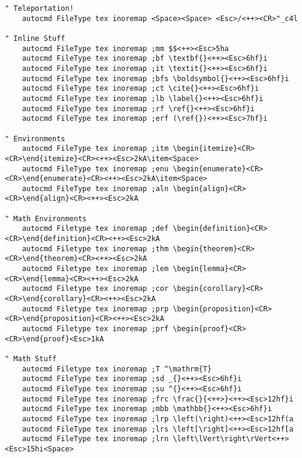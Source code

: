 \documentclass[10pt]{article}
\newtheorem{theorem}{Theorem}[section]
\newtheorem{lemma}[theorem]{Lemma}
\newtheorem{proposition}[theorem]{Proposition}
\newtheorem{corollary}[theorem]{Corollary}
\newtheorem{definition}[theorem]{Definition}
\begin{document}
\begin{lstlisting}
" Teleportation!
    autocmd FileType tex inoremap <Space><Space> <Esc>/<++><CR>"_c4l

" Inline Stuff
    autocmd FileType tex inoremap ;mm $$<++><Esc>5ha
    autocmd FileType tex inoremap ;bf \textbf{}<++><Esc>6hf}i
    autocmd FileType tex inoremap ;it \textit{}<++><Esc>6hf}i
    autocmd FileType tex inoremap ;bfs \boldsymbol{}<++><Esc>6hf}i
    autocmd FileType tex inoremap ;ct \cite{}<++><Esc>6hf}i
    autocmd FileType tex inoremap ;lb \label{}<++><Esc>6hf}i
    autocmd FileType tex inoremap ;rf \ref{}<++><Esc>6hf}i
    autocmd FileType tex inoremap ;erf (\ref{})<++><Esc>7hf}i

" Environments
    autocmd FileType tex inoremap ;itm \begin{itemize}<CR><CR>\end{itemize}<CR><++><Esc>2kA\item<Space>
    autocmd FileType tex inoremap ;enu \begin{enumerate}<CR><CR>\end{enumerate}<CR><++><Esc>2kA\item<Space>
    autocmd FileType tex inoremap ;aln \begin{align}<CR><CR>\end{align}<CR><++><Esc>2kA

" Math Environments
    autocmd Filetype tex inoremap ;def \begin{definition}<CR><CR>\end{definition}<CR><++><Esc>2kA
    autocmd Filetype tex inoremap ;thm \begin{theorem}<CR><CR>\end{theorem}<CR><++><Esc>2kA
    autocmd Filetype tex inoremap ;lem \begin{lemma}<CR><CR>\end{lemma}<CR><++><Esc>2kA
    autocmd Filetype tex inoremap ;cor \begin{corollary}<CR><CR>\end{corollary}<CR><++><Esc>2kA
    autocmd Filetype tex inoremap ;prp \begin{proposition}<CR><CR>\end{proposition}<CR><++><Esc>2kA
    autocmd Filetype tex inoremap ;prf \begin{proof}<CR><CR>\end{proof}<Esc>1kA

" Math Stuff
    autocmd Filetype tex inoremap ;T ^\mathrm{T}
    autocmd FileType tex inoremap ;sd _{}<++><Esc>6hf}i
    autocmd FileType tex inoremap ;su ^{}<++><Esc>6hf}i
    autocmd FileType tex inoremap ;frc \frac{}{<++>}<++><Esc>12hf}i
    autocmd FileType tex inoremap ;mbb \mathbb{}<++><Esc>6hf}i
    autocmd FileType tex inoremap ;lrp \left(\right)<++><Esc>12hf(a
    autocmd FileType tex inoremap ;lrs \left[\right]<++><Esc>12hf[a
    autocmd FileType tex inoremap ;lrn \left\lVert\right\rVert<++><Esc>15hi<Space>
\end{lstlisting}
\end{document}
